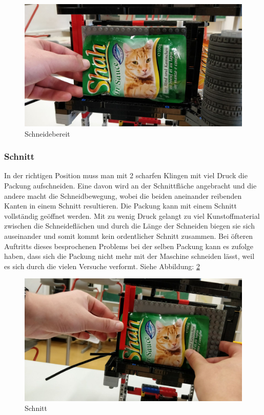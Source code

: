 \begin{figure}[H]
\begin{center}
\includegraphics[width=13cm]{Bilder/Ablauf_1_png/Schneidebereit.jpeg}
\caption{Schneidebereit}
\label{Schneidebereit}
\end{center}
\end{figure}

\subsubsection{Schnitt}

In der richtigen Position muss man mit 2 scharfen Klingen mit viel Druck die Packung aufschneiden. Eine davon wird an der Schnittfläche angebracht und die andere macht die Schneidbewegung, wobei die beiden aneinander reibenden Kanten in einem Schnitt resultieren. Die Packung kann mit einem Schnitt vollständig geöffnet werden. Mit zu wenig Druck gelangt zu viel Kunstoffmaterial zwischen die Schneideflächen und durch die Länge der Schneiden biegen sie sich auseinander und somit kommt kein ordentlicher Schnitt zusammen. Bei öfteren Auftritts dieses besprochenen Problems bei der selben Packung kann es zufolge haben, dass sich die Packung nicht mehr mit der Maschine schneiden lässt, weil es sich durch die vielen Versuche verformt.  Siehe Abbildung: \ref{Schnitt}

\begin{figure}[H]
\begin{center}
\includegraphics[width=13cm]{Bilder/Ablauf_1_png/Schnitt}
\caption{Schnitt}
\label{Schnitt}
\end{center}
\end{figure} 

